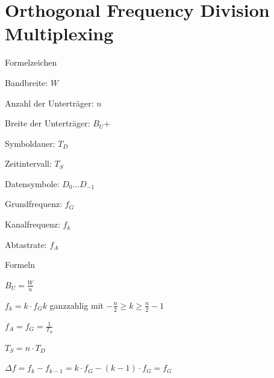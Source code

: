 \documentclass[german]{latex4ei/latex4ei_sheet}
\begin{document}
    \section{Orthogonal Frequency Division Multiplexing}
    \begin{sectionbox}
        \begin{symbolbox}{Formelzeichen}
            \item Bandbreite: $W$
            \item Anzahl der Unterträger: $n$
            \item Breite der Unterträger: $B_U$+
            \item Symboldauer: $T_D$
            \item Zeitintervall: $T_S$ 
            \item Datensymbole: $D_0 \dots D_{-1}$
            \item Grundfrequenz: $f_G$
            \item Kanalfrequenz: $f_k$
            \item Abtastrate: $f_A$
        \end{symbolbox}
        
        \begin{bluebox}{Formeln}
            \item $B_U = \frac{W}{n}$
            \item $f_k =k \cdot f_G$\quad $k$ ganzzahlig mit $-\frac{n}{2}\geq k \geq \frac{n}{2}-1$ 
            \item $f_A = f_G = \frac{1}{T_S}$
            \item $T_S = n \cdot T_D$
            \item $\Delta f = f_k - f_{k-1} = k\cdot f_G -(k-1)\cdot f_G = f_G$
        \end{bluebox}
    \end{sectionbox}
\end{document}
